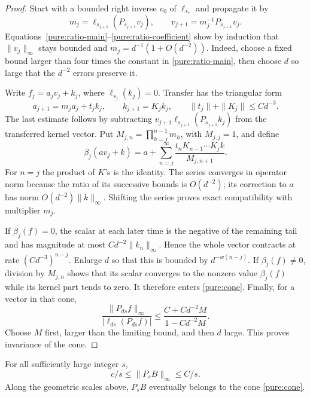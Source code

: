 \begin{proof}
Start with a bounded right inverse $v_0$ of $\ell_{s_*}$ and propagate it
by
\[
 m_j=\ell_{s_{j+1}}(P_{s_{j+1}}v_j),\qquad
 v_{j+1}=m_j^{-1}P_{s_{j+1}}v_j.
\]
Equations~\eqref{pure:ratio-main}--\eqref{pure:ratio-coefficient} show by
induction that $\|v_j\|_\infty$ stays bounded and
$m_j=d^{-1}(1+O(d^{-2}))$.  Indeed, choose a fixed bound larger than four
times the constant in \eqref{pure:ratio-main}, then choose $d$ so large
that the $d^{-2}$ errors preserve it.

Write $f_j=a_jv_j+k_j$, where $\ell_{s_j}(k_j)=0$.  Transfer has the
triangular form
\[
 a_{j+1}=m_ja_j+t_jk_j,\qquad k_{j+1}=K_jk_j,
 \qquad \|t_j\|+\|K_j\|\leq C d^{-3}.
\]
The last estimate follows by subtracting
$v_{j+1}\ell_{s_{j+1}}(P_{s_{j+1}}k_j)$ from the transferred kernel
vector.  Put $M_{j,n}=\prod_{h=j}^{n-1}m_h$, with $M_{j,j}=1$, and
define
\[
 \beta_j(a v_j+k)
  =a+\sum_{n=j}^{\infty}
       \frac{t_n K_{n-1}\cdots K_jk}{M_{j,n+1}}.
\]
For $n=j$ the product of $K$'s is the identity.  The series converges in
operator norm because the ratio of its successive bounds is $O(d^{-2})$;
its correction to $a$ has norm $O(d^{-2})\|k\|_\infty$.
Shifting the series proves exact compatibility with multiplier $m_j$.

If $\beta_j(f)=0$, the scalar at each later time is the negative of the
remaining tail and has magnitude at most $C d^{-2}\|k_n\|_\infty$.
Hence the whole vector contracts at rate $(C d^{-3})^{n-j}$.  Enlarge $d$
so that this is bounded by $d^{-w(n-j)}$.  If $\beta_j(f)\ne0$, division
by $M_{j,n}$ shows that its scalar converges to the nonzero value
$\beta_j(f)$ while its kernel part tends to zero.  It therefore enters
\eqref{pure:cone}.  Finally, for a vector in that cone,
\[
 \frac{\|P_{ds}f\|_\infty}{|\ell_{ds}(P_{ds}f)|}
 \leq \frac{C+C d^{-2}M}{1-C d^{-2}M}.
\]
Choose $M$ first, larger than the limiting bound, and then $d$ large.
This proves invariance of the cone.
\end{proof}

\begin{lemma}
\label{pure:calibration}
For all sufficiently large integer $s$,
\begin{equation}
 c/s\leq\|P_sB\|_\infty\leq C/s.
 \label{pure:energy-norm}
\end{equation}
Along the geometric scales above, $P_sB$ eventually belongs to the cone
\eqref{pure:cone}.
\end{lemma}

